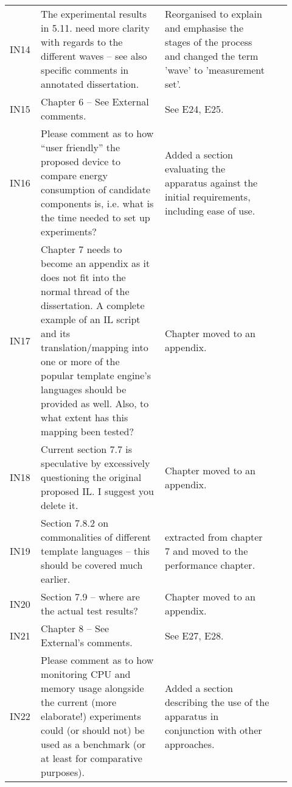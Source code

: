 \begin{longtable}{>{\raggedright} p{0.06\linewidth} | >{\raggedright} p{0.42\linewidth} | >{\raggedright} p{0.39\linewidth} | p{0.045\linewidth}}
    IN14 & The experimental results in 5.11. need more clarity with regards to the different waves – see also specific comments in annotated dissertation.
    & Reorganised to explain and emphasise the stages of the process and changed the term 'wave' to 'measurement set'. & \p{fs2:results} \\

    IN15 & Chapter 6 – See External comments.
    & See E24, E25. & \\

    IN16 & Please comment as to how “user friendly” the proposed device to compare energy consumption of candidate components is, i.e. what is the time needed to set up experiments?
    & Added a section evaluating the apparatus against the initial requirements, including ease of use. & \p{testrig:evaluation} \\

    IN17 & Chapter 7 needs to become an appendix as it does not fit into the normal thread of the dissertation. A complete example of an IL script and its translation/mapping into one or more of the popular template engine’s languages should be provided as well. Also, to what extent has this mapping been tested?
    & Chapter moved to an appendix. & \\

    IN18 & Current section 7.7 is speculative by excessively questioning the original proposed IL. I suggest you delete it.
    & Chapter moved to an appendix. & \\

    IN19 & Section 7.8.2 on commonalities of different template languages – this should be covered much earlier.
    & extracted from chapter 7 and moved to the performance chapter. & \p{section:comp:languages} \\

    IN20 & Section 7.9 – where are the actual test results?
    & Chapter moved to an appendix. & \\

    IN21 & Chapter 8 – See External’s comments.
    & See E27, E28. & \\

    IN22 & Please comment as to how monitoring CPU and memory usage alongside the current (more elaborate!) experiments could (or should not) be used as a benchmark (or at least for comparative purposes).
    & Added a section describing the use of the apparatus in conjunction with other approaches. & \p{collaboration} \\


\end{longtable}
